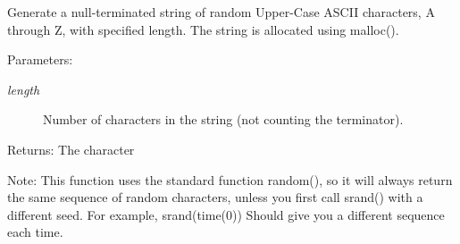 Generate a null-terminated string of random Upper-Case ASCII characters, A through Z, with specified length. The string is allocated using malloc().

\begin{Desc}
\item[Parameters:]
\begin{description}
\item[{\em length}]Number of characters in the string (not counting the terminator). \end{description}
\end{Desc}
\begin{Desc}
\item[Returns:]The character\end{Desc}
Note: This function uses the standard function random(), so it will always return the same sequence of random characters, unless you first call srand() with a different seed. For example, srand(time(0)) Should give you a different sequence each time. 